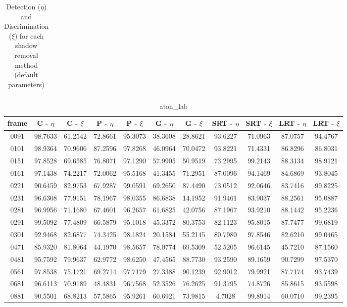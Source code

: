 \begin{appendices}
\begin{table}
\begin{tabular}{ |c|c|c|c|c|c|c|c|c|c|c| }
\hline
\end{tabular}
\caption*{Detection ($\eta$) and Discrimination ($\xi$) for each shadow removal method (default parameters)}
\end{table}

\begin{table}
\centering
\caption{aton\_lab}
\begin{tabular}{ |c|c|c|c|c|c|c|c|c|c|c| }
	\hline
\textbf{frame} &  \textbf{C - $\eta$} &  \textbf{C - $\xi$} &  \textbf{P - $\eta$} &  \textbf{P - $\xi$} &  \textbf{G - $\eta$} &  \textbf{G - $\xi$} &  \textbf{SRT - $\eta$} &  \textbf{SRT - $\xi$} &  \textbf{LRT - $\eta$} &  \textbf{LRT - $\xi$} \\
\hline
\hline
0091 &  98.7633 &  61.2542 &   72.8661 &  95.3073 &   38.3608 &  28.8621 &   93.6227 &  71.0963 &   87.0757 &  94.4767    \\
\hline
0101 &  98.9364 &  70.9606 &   87.2596 &  97.8268 &   46.0964 &  70.0472 &   93.8221 &  71.4331 &   86.8296 &  86.8031    \\
\hline
0151 &  97.8528 &  69.6585 &   76.8071 &  97.1290 &   57.9905 &  50.9519 &   73.2995 &  99.2143 &   88.3134 &  98.9121    \\
\hline
0161 &  97.1438 &  74.2217 &   72.0062 &  95.5168 &   41.3455 &  71.2951 &   87.0096 &  94.1469 &   84.6869 &  93.8045    \\
\hline
0221 &  90.6459 &  82.9753 &   67.9287 &  99.0591 &   69.2650 &  87.4490 &   73.0512 &  92.0646 &   83.7416 &  99.8225    \\
\hline
0231 &  96.6308 &  77.9151 &   78.1967 &  98.0355 &   86.6838 &  14.1952 &   91.9461 &  83.9037 &   88.2561 &  95.0887    \\
\hline
0281 &  96.9956 &  71.1680 &   67.4601 &  96.2657 &   61.6825 &  42.0756 &   87.1967 &  93.9210 &   88.1442 &  95.2236    \\
\hline
0291 &  99.5092 &  77.4809 &   66.5879 &  95.1018 &   45.3372 &  80.3753 &   82.1123 &  95.8015 &   87.7477 &  99.6819    \\
\hline
0301 &  92.9468 &  82.6877 &   74.3425 &  98.1824 &   20.1584 &  55.2145 &   80.7980 &  97.8546 &   82.6210 &  99.0465    \\
\hline
0471 &  85.9320 &  81.8064 &   44.1970 &  98.5657 &   78.0774 &  69.5309 &   52.5205 &  96.6145 &   45.7210 &  87.1560    \\
\hline
0481 &  95.7592 &  79.9637 &   62.9772 &  98.6250 &   47.4565 &  88.7730 &   93.2590 &  89.1659 &   90.7299 &  97.5370    \\
\hline
0561 &  97.8538 &  75.1721 &   69.2714 &  97.7179 &   27.3388 &  90.1239 &   92.9012 &  79.9921 &   87.7174 &  93.7439   \\
\hline
0681 &  96.6113 &  70.9189 &   48.4831 &  96.7568 &   52.3526 &  76.2625 &   91.3795 &  74.8726 &   85.8615 &  93.5598    \\
\hline
0881 &  90.5501 &  68.8213 &   57.5865 &  95.9261 &   60.6921 &  73.9815 &   4.7028 &  99.8914 &   60.0710 &  99.2395    \\


\end{tabular}
\end{table}
\end{appendices}
